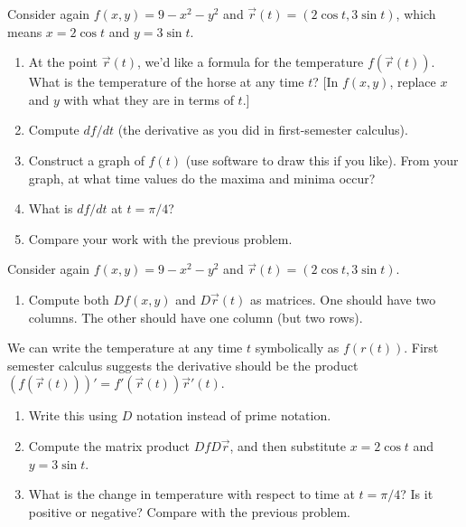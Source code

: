 


\begin{problem}
 Consider again $f(x,y)=9-x^2-y^2$ and $\vec r(t)=(2\cos t, 3\sin t)$, which means $x=2\cos t$ and $y=3\sin t$. 
\begin{enumerate}
 \item At the point $\vec r(t)$, we'd like a formula for the temperature $f(\vec r(t))$. What is the temperature of the horse at any time $t$? [In $f(x,y)$, replace $x$ and $y$ with what they are in terms of $t$.]
 \item Compute $df/dt$ (the derivative as you did in first-semester calculus).
 \item Construct a graph of $f(t)$ (use software to draw this if you like). From your graph, at what time values do the maxima and minima occur?
 \item What is $df/dt$ at $t=\pi/4$?
 \item Compare your work with the previous problem.
\end{enumerate}
\end{problem}

\begin{problem}
 Consider again $f(x,y)=9-x^2-y^2$ and $\vec r(t)=(2\cos t, 3\sin t)$.
\begin{enumerate}
 \item Compute both $Df(x,y)$ and $D\vec r(t)$ as matrices. One should have two columns.  The other should have one column (but two rows). 
\end{enumerate}
We can write the temperature at any time $t$ symbolically as $f(r(t))$.  First semester calculus suggests the derivative should be the product $(f(\vec r(t))) ' = f'(\vec r(t))\vec r'(t)$. \begin{enumerate}[resume]
	\item Write this using $D$ notation instead of prime notation.
	\item Compute the matrix product $DfD\vec r$, and then substitute $x=2\cos t$ and $y=3\sin t$.    
	\item What is the change in temperature with respect to time at $t=\pi/4$? Is it positive or negative? Compare with the previous problem.
\end{enumerate}
\end{problem}

